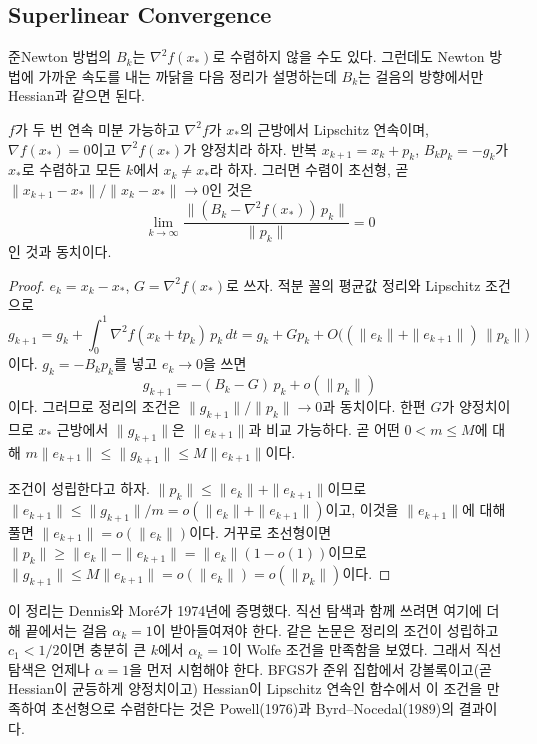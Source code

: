 \subsection{Superlinear Convergence}

준Newton 방법의 $B_k$는 $\nabla^2f(x_\ast)$로 수렴하지 않을 수도 있다. 그런데도 Newton 방법에 가까운 속도를 내는 까닭을 다음 정리가 설명하는데 $B_k$는 걸음의 방향에서만 Hessian과 같으면 된다.

\begin{theorem}
\label{thm:dennis-more}
$f$가 두 번 연속 미분 가능하고 $\nabla^2f$가 $x_\ast$의 근방에서 Lipschitz 연속이며, $\nabla f(x_\ast)=0$이고 $\nabla^2f(x_\ast)$가 양정치라 하자. 반복 $x_{k+1}=x_k+p_k$, $B_kp_k=-g_k$가 $x_\ast$로 수렴하고 모든 $k$에서 $x_k\ne x_\ast$라 하자. 그러면 수렴이 초선형, 곧 $\|x_{k+1}-x_\ast\|/\|x_k-x_\ast\|\to0$인 것은
\[
\lim_{k\to\infty}\frac{\|(B_k-\nabla^2f(x_\ast))\,p_k\|}{\|p_k\|}=0
\]
인 것과 동치이다.
\end{theorem}

\begin{proof}
$e_k=x_k-x_\ast$, $G=\nabla^2f(x_\ast)$로 쓰자. 적분 꼴의 평균값 정리와 Lipschitz 조건으로
\[
g_{k+1}=g_k+\int_0^1\nabla^2f(x_k+tp_k)\,p_k\,dt=g_k+Gp_k+O\bigl((\|e_k\|+\|e_{k+1}\|)\,\|p_k\|\bigr)
\]
이다. $g_k=-B_kp_k$를 넣고 $e_k\to0$을 쓰면
\[
g_{k+1}=-(B_k-G)\,p_k+o(\|p_k\|)
\]
이다. 그러므로 정리의 조건은 $\|g_{k+1}\|/\|p_k\|\to0$과 동치이다. 한편 $G$가 양정치이므로 $x_\ast$ 근방에서 $\|g_{k+1}\|$은 $\|e_{k+1}\|$과 비교 가능하다. 곧 어떤 $0<m\le M$에 대해 $m\|e_{k+1}\|\le\|g_{k+1}\|\le M\|e_{k+1}\|$이다.

조건이 성립한다고 하자. $\|p_k\|\le\|e_k\|+\|e_{k+1}\|$이므로 $\|e_{k+1}\|\le\|g_{k+1}\|/m=o(\|e_k\|+\|e_{k+1}\|)$이고, 이것을 $\|e_{k+1}\|$에 대해 풀면 $\|e_{k+1}\|=o(\|e_k\|)$이다. 거꾸로 초선형이면 $\|p_k\|\ge\|e_k\|-\|e_{k+1}\|=\|e_k\|(1-o(1))$이므로 $\|g_{k+1}\|\le M\|e_{k+1}\|=o(\|e_k\|)=o(\|p_k\|)$이다.
\end{proof}

이 정리는 Dennis와 Moré가 1974년에 증명했다\cite{dennis1974}. 직선 탐색과 함께 쓰려면 여기에 더해 끝에서는 걸음 $\alpha_k=1$이 받아들여져야 한다. 같은 논문은 정리의 조건이 성립하고 $c_1<1/2$이면 충분히 큰 $k$에서 $\alpha_k=1$이 Wolfe 조건을 만족함을 보였다. 그래서 직선 탐색은 언제나 $\alpha=1$을 먼저 시험해야 한다. BFGS가 준위 집합에서 강볼록이고(곧 Hessian이 균등하게 양정치이고) Hessian이 Lipschitz 연속인 함수에서 이 조건을 만족하여 초선형으로 수렴한다는 것은 Powell(1976)과 Byrd--Nocedal(1989)의 결과이다\cite{nocedal2006}.

